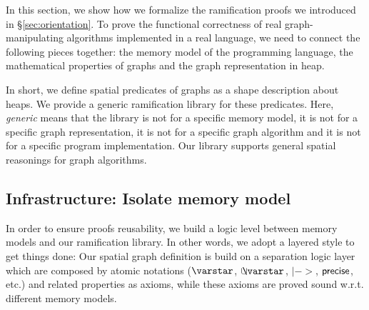 In this section, we show how we formalize the ramification proofs we introduced in \S\ref{sec:orientation}. To prove the functional correctness of real graph-manipulating
algorithms implemented in a real language, we need to connect the following pieces together: the memory model of the programming language, the mathematical properties of graphs and the graph representation in heap.

In short, we define spatial predicates of graphs as a shape
description about heaps. We provide a generic ramification library for these predicates. Here, \emph{generic} means that the library is not for a specific memory model, it is not for a specific graph representation, it is not for a specific graph algorithm and it is not for a specific program implementation. Our library supports general spatial reasonings for graph algorithms.

\subsection{Infrastructure: Isolate memory model}

In order to ensure proofs reusability, we build a logic level between
memory models and our ramification library.  In other words, we adopt
a layered style to get things done: Our spatial graph definition is
build on a separation logic layer which are composed by atomic
notations ($\scon$, $\ocon$, $|->$, $\mathsf{precise}$, etc.) and related
properties as axioms, while these axioms are proved sound
w.r.t. different memory models.

